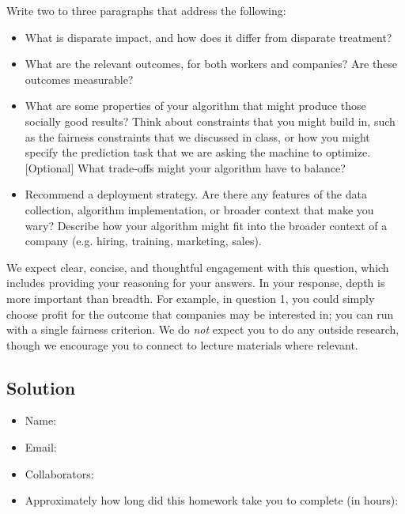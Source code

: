 \documentclass[submit]{harvardml}
\begin{document}
\begin{problem}
Write two to three paragraphs that address the following:
\begin{itemize}
\item What is disparate impact, and how does it differ from disparate treatment?  
\item What are the relevant outcomes, for both workers and companies?  Are these outcomes measurable?  
\item What are some properties of your algorithm that might produce those socially good results?  Think about constraints that you might build in, such as the fairness constraints that we discussed in class, or how you might specify the prediction task that we are asking the machine to optimize.  [Optional] What trade-offs might your algorithm have to balance?  
\item Recommend a deployment strategy.  Are there any features of the data collection, algorithm implementation, or broader context that make you wary?  Describe how your algorithm might fit into the broader context of a company (e.g. hiring, training, marketing, sales).  
\end{itemize} 

We expect clear, concise, and thoughtful engagement with this question, which includes providing your reasoning for your answers.  In your response, depth is more important than breadth.  For example, in question 1, you could simply choose profit for the outcome that companies may be interested in; you can run with a single fairness criterion. We do \emph{not} expect you to do any outside research, though we encourage you to connect to lecture materials where relevant.

\end{problem}

\subsection*{Solution}
  

\newpage

\begin{itemize}
    \item Name:
    \item Email:
    \item Collaborators:
    \item Approximately how long did this homework take you to complete (in hours):   
\end{itemize}
\end{document}
